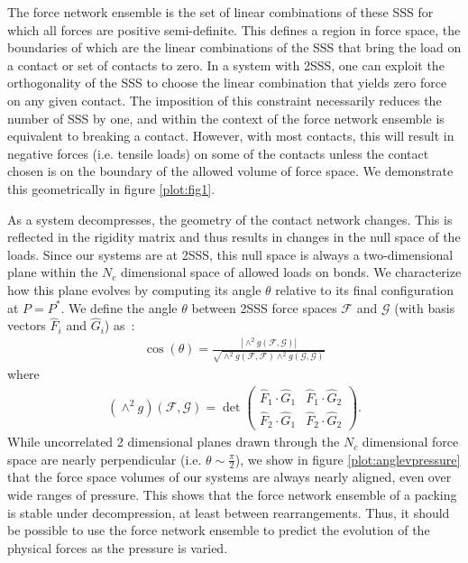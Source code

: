 The force network ensemble is the set of linear combinations of these SSS for which all forces are positive semi-definite. This defines a region in force space, the boundaries of which are the linear combinations of the SSS that bring the load on a contact or set of contacts to zero. 
In a system with 2SSS, one can exploit the orthogonality of the SSS to choose the linear combination that yields zero force on any given contact. The imposition of this constraint necessarily reduces the number of SSS by one, and within the context of the force network ensemble is equivalent to breaking a contact. However, with most contacts, this will result in negative forces (i.e. tensile loads) on some of the contacts unless the contact chosen is on the boundary of the allowed volume of force space. We demonstrate this geometrically in figure \ref{plot:fig1}.  




As a system decompresses, the geometry of the contact network changes. This is reflected in the rigidity matrix and thus results in changes in the null space of the loads. Since our systems are at 2SSS, this null space is always a two-dimensional plane within the $N_c$ dimensional space of allowed loads on bonds. We characterize how this plane evolves by computing its angle $\theta$ relative to its final configuration at $P=P^*$. We define the angle $\theta$ between 2SSS force spaces $\mathcal{F}$ and $\mathcal{G}$ (with basis vectors $\hat F_i$ and $\hat G_i$) as~\cite{jordan_essai_1875}:
%
\begin{align}
\cos (\theta) = \frac{|\wedge^2 g(\mathcal{F}, \mathcal{G})|}{\sqrt{ \wedge^2 g (\mathcal{F},\mathcal{F}) \wedge^2 g(\mathcal{G},\mathcal{G})}}
\end{align}
where
\begin{align}
(\wedge^2 g) (\mathcal{F}, \mathcal{G}) = \det\begin{pmatrix} \hat F_1 \cdot \hat G_1 & \hat F_1 \cdot \hat G_2 \\ \hat F_2 \cdot \hat G_1 & \hat F_2 \cdot \hat G_2 \end{pmatrix}.
\end{align}
%
While uncorrelated 2 dimensional planes drawn through the $N_c$ dimensional force space are nearly perpendicular (i.e. $\theta \sim \frac{\pi}{2}$), we show in figure \ref{plot:anglevpressure} that the force space volumes of our systems are always nearly aligned, even over wide ranges of pressure. This shows that the force network ensemble of a packing is stable under decompression, at least between rearrangements. Thus, it should be possible to use the force network ensemble to predict the evolution of the physical forces as the pressure is varied.


